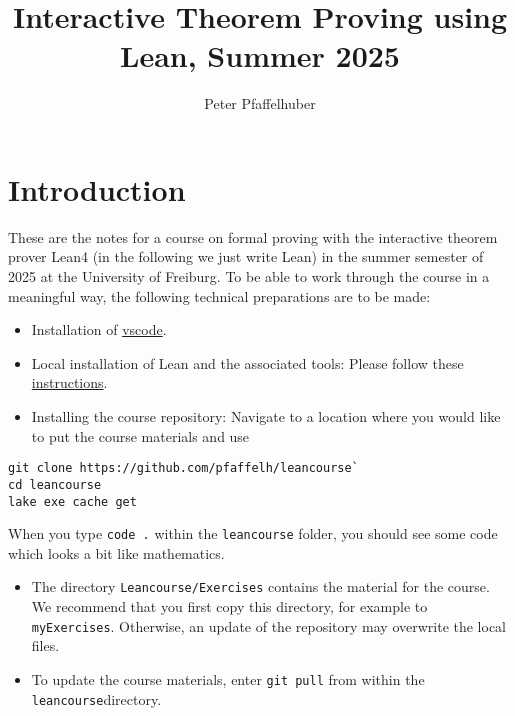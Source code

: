\documentclass{memoir}
\title{\sffamily Interactive Theorem Proving using Lean, Summer 2025}
\author{\sffamily Peter Pfaffelhuber}
\date{\sffamily }
\begin{document}
\frontmatter

\begin{titlingpage}
\maketitle
\end{titlingpage}

\tableofcontents

\mainmatter

\chapter*{Introduction}
These are the notes for a course on formal proving with the interactive theorem prover Lean4 (in the following we just write Lean) in the summer semester of 2025 at the University of Freiburg. To be able to work through the course in a meaningful way, the following technical preparations are to be made:
\begin{itemize}
\item Installation of \hyperlink{"https://code.visualstudio.com/"}{vscode}.\item Local installation of Lean and the associated tools: Please follow these \hyperlink{"https://leanprover-community.github.io/get_started.html#regular-install"}{instructions}.\item Installing the course repository: Navigate to a location where you would like to put the course materials and use
\end{itemize}

\begin{verbatim}
git clone https://github.com/pfaffelh/leancourse`
cd leancourse
lake exe cache get

\end{verbatim}

When you type \Verb|code .| within the \Verb|leancourse| folder, you should see some code which looks a bit like mathematics.
\begin{itemize}
\item The directory \Verb|Leancourse/Exercises| contains the material for the course. We recommend that you first copy this directory, for example to \Verb|myExercises|. Otherwise, an update of the repository may overwrite the local files.\item To update the course materials, enter \Verb|git pull| from within the \Verb|leancourse|directory.
\end{itemize}
\end{document}
